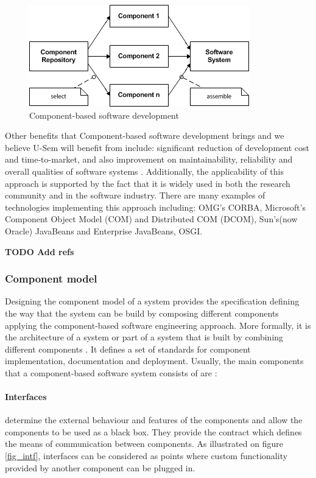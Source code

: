 \begin{figure}[h!]
  \centering
  	\includegraphics[scale=0.75]{plug-in/component-based.png}
  \caption{Component-based software development \cite{pour1998component} }
  \label{fig_cbsd}
\end{figure}

Other benefits that Component-based software development brings and we believe U-Sem will benefit from include: significant reduction of development cost and time-to-market, and also improvement on maintainability, reliability and overall qualities of software systems \cite{pour1999enterprise} \cite{pour1999making}. Additionally, the applicability of this approach is supported by the fact that it is widely used in both the research community and in the software industry. There are many examples of technologies implementing this approach including: OMG's CORBA,  Microsoft's Component Object Model (COM) and Distributed COM (DCOM), Sun's(now Oracle) JavaBeans and Enterprise JavaBeans, OSGI.

\textbf{TODO Add refs}

\subsubsection{Component model}

Designing the component model of a system provides the specification defining the way that the system can be build by composing different components applying the component-based software engineering approach. More formally, it is the architecture of a system or part of a system that is built by combining different components \cite{cai2000component}. It defines a set of  standards for component implementation, documentation and deployment. Usually, the main components that a component-based software system consists of are \cite{chen2009refinement}:

\paragraph{Interfaces}
	determine the external behaviour and features of the components and allow the components to be used as a black box. They provide the contract which defines the means of communication between components. As illustrated on figure \ref{fig_intf}, interfaces can be considered as points where custom functionality provided by another component can be plugged in. 
	
